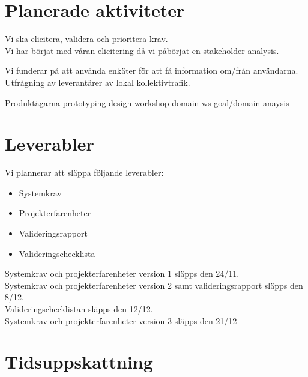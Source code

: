 \documentclass[a4paper]{article}
\begin{document}
	\section{Planerade aktiviteter}
		Vi ska elicitera, validera och prioritera krav.\\
		
		Vi har börjat med våran elicitering då vi påbörjat en stakeholder analysis.
		
		Vi funderar på att använda enkäter för att få information om/från användarna. Utfrågning av leverantärer av lokal kollektivtrafik.
		
		Produktägarna
			prototyping
			design workshop
			domain ws
			goal/domain anaysis

	\section{Leverabler} %
	\label{sec:deliverables}
		Vi plannerar att släppa följande leverabler:
		\begin{itemize}
			\item Systemkrav
			\item Projekterfarenheter
			\item Valideringsrapport
			\item Valideringschecklista
		\end{itemize}
		Systemkrav och projekterfarenheter version 1 släpps den 24/11.\\
		Systemkrav och projekterfarenheter version 2 samt valideringsrapport släpps den 8/12.\\
		Valideringschecklistan släpps den 12/12.\\
		Systemkrav och projekterfarenheter version 3 släpps den 21/12\\ 		

	\section{Tidsuppskattning}
	
\end{document}
